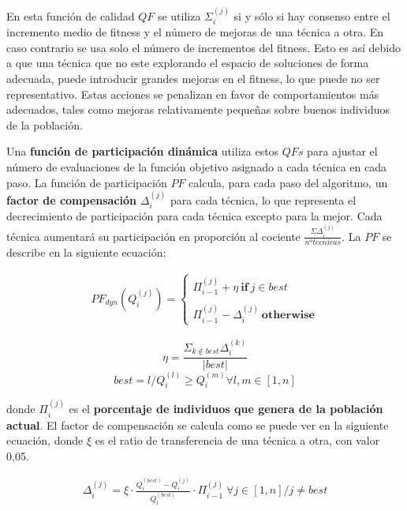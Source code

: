 En esta función de calidad $QF$ se utiliza $\Sigma_{i}^{(j)}$ si y sólo si hay consenso entre el incremento medio de fitness y el número de mejoras de una técnica a otra. En caso contrario se usa solo el número de incrementos del fitness. Esto es así debido a que una técnica que no este explorando el espacio de soluciones de forma adecuada, puede introducir grandes mejoras en el fitness, lo que puede no ser representativo. Estas acciones se penalizan en favor de comportamientos más adecuados, tales como mejoras relativamente pequeñas sobre buenos individuos de la población.

Una \textbf{función de participación dinámica} utiliza estos $QFs$ para ajustar el número de evaluaciones de la función objetivo asignado a cada técnica en cada paso. La función de participación $PF$ calcula, para cada paso del algoritmo, un \textbf{factor de compensación} $\Delta_i^{(j)}$ para cada técnica, lo que representa el decrecimiento de participación para cada técnica excepto para la mejor. Cada técnica aumentará su participación en proporción al cociente $\frac{\Sigma \Delta_{i}^{(j)}}{nº tecnicas}$. La $PF$ se describe en la siguiente ecuación:

\begin{equation}\label{eq:PF_MOS}
	\begin{gathered}
		PF_{dyn}(Q_i^{(j)} )= \begin{cases}
			\Pi_{i-1}^{(j)} + \eta \ \textbf{if} \ j \in best \\ \\
			\Pi_{i-1}^{(j)} - \Delta_i^{(j)} \ \textbf{otherwise}
		\end{cases}
	\end{gathered}
\end{equation}

$$
\eta = \frac{\Sigma_{k\notin best}\Delta_i^{(k)}}{|best|}
$$
$$
best = {l/Q_i^{(l)} \geq Q_i^{(m)} \forall l,m \in [1,n]}
$$

donde $\Pi_i^{(j)}$ es el \textbf{porcentaje de individuos que genera de la población actual}. El factor de compensación se calcula como se puede ver en la siguiente ecuación, donde $\xi$ es el ratio de transferencia de una técnica a otra, con valor 0,05.

\begin{equation}\label{eq:RatioCompensacion}
	\begin{gathered}
		\Delta_i^{(j)} = \xi \cdot \frac{Q_i^{(best)} - Q_i^{(j)}} {Q_i^{(best)}} \cdot \Pi_{i-1}^{(j)} \ \forall j \in [1,n]/j \neq best
	\end{gathered}
\end{equation}

